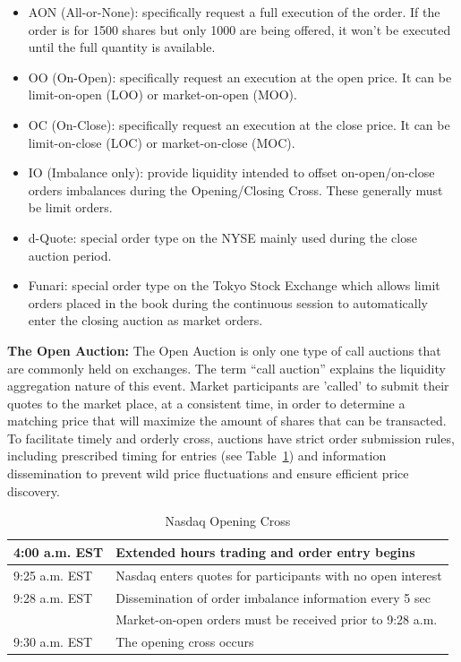 \begin{itemize}
\item  AON (All-or-None): specifically request a full execution of the order. If the order is for 1500 shares but only 1000 are being offered, it won't be executed until the full quantity is available.
\item  OO (On-Open): specifically request an execution at the open price. It can be limit-on-open (LOO) or market-on-open (MOO).
\item  OC (On-Close): specifically request an execution at the close price. It can be limit-on-close (LOC) or market-on-close (MOC).
\item  IO (Imbalance only): provide liquidity intended to offset on-open/on-close orders imbalances during the Opening/Closing Cross. These generally must be limit orders.
\item  d-Quote: special order type on the NYSE mainly used during the close auction period.
\item  Funari: special order type on the Tokyo Stock Exchange which allows limit orders placed in the book during the continuous session to automatically enter the closing auction as market orders.
\end{itemize} 



\noindent\textbf{The Open Auction:} The Open Auction is only one type of call auctions that are commonly held on exchanges. The term ``call auction'' explains the liquidity aggregation nature of this event. Market participants are 'called' to submit their quotes to the market place, at a consistent time, in order to determine a matching price that will maximize the amount of shares that can be transacted. To facilitate timely and orderly cross, auctions have strict order submission rules, including prescribed timing for entries (see Table~\ref{tab:NASDAQopen}) and information dissemination to prevent wild price fluctuations and ensure efficient price discovery.

\begin{table}[!ht]
   \centering
   \caption{Nasdaq Opening Cross\label{tab:NASDAQopen}}
   \begin{tabular}{ll} 
	4:00 a.m. EST & Extended hours trading and order entry begins  \\ \hline
	9:25 a.m. EST & Nasdaq enters quotes for participants with no open interest \\ \hline
	9:28 a.m. EST & Dissemination of order imbalance information every 5 sec  \\ 
	 & Market-on-open orders must be received prior to 9:28 a.m.   \\ \hline	
	9:30 a.m. EST & The opening cross occurs		
   \end{tabular}
\end{table}	


